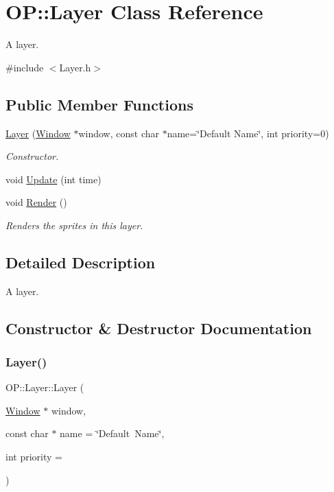 \hypertarget{class_o_p_1_1_layer}{}\section{OP\+::Layer Class Reference}
\label{class_o_p_1_1_layer}


A layer.  




{\ttfamily \#include $<$Layer.\+h$>$}

\subsection*{Public Member Functions}
\begin{DoxyCompactItemize}
\item 
\mbox{\hyperlink{class_o_p_1_1_layer_a5e7550e8e25ad08d40d4c36e63ad44f5}{Layer}} (\mbox{\hyperlink{class_o_p_1_1_window}{Window}} $\ast$window, const char $\ast$name=\char`\"{}Default Name\char`\"{}, int priority=0)
\begin{DoxyCompactList}\small\item\em Constructor. \end{DoxyCompactList}\item 
void \mbox{\hyperlink{class_o_p_1_1_layer_a0a681d9c3c2c0d4be5f1eadb67848188}{Update}} (int time)
\item 
void \mbox{\hyperlink{class_o_p_1_1_layer_ad835cb6310f9b0c355bc8f186d8e8281}{Render}} ()
\begin{DoxyCompactList}\small\item\em Renders the sprites in this layer. \end{DoxyCompactList}\end{DoxyCompactItemize}


\subsection{Detailed Description}
A layer. 

\subsection{Constructor \& Destructor Documentation}
\mbox{\label{class_o_p_1_1_layer_a5e7550e8e25ad08d40d4c36e63ad44f5}} 
\subsubsection{\texorpdfstring{Layer()}{Layer()}}
{\footnotesize\ttfamily O\+P\+::\+Layer\+::\+Layer (\begin{DoxyParamCaption}\item[{\mbox{\hyperlink{class_o_p_1_1_window}{Window}} $\ast$}]{window,  }\item[{const char $\ast$}]{name = {\ttfamily \char`\"{}Default~Name\char`\"{}},  }\item[{int}]{priority = {} }\end{DoxyParamCaption})}



